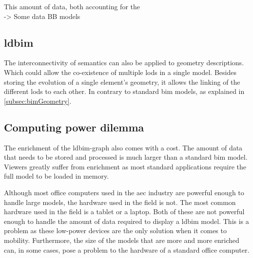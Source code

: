 This amount of data, both accounting for the \\
-> Some data BB models

\subsection{\acs{ldbim}}





The interconnectivity of semantics can also be applied to geometry descriptions. Which could allow the co-existence of multiple \ac{lod}s in a single model. Besides storing the evolution of a single element's geometry, it allows the linking of the different \ac{lod}s to each other. In contrary to standard \ac{bim} models, as explained in \ref{subsec:bimGeometry}.

\subsection{Computing power dilemma} \label{subsec:computingPower}
The enrichment of the \ac{ldbim}-graph also comes with a cost. The amount of data that needs to be stored and processed is much larger than a standard \ac{bim} model. Viewers greatly suffer from enrichment as most standard applications require the full model to be loaded in memory.

Although most office computers used in the \ac{aec} industry are powerful enough to handle large models, the hardware used in the field is not. The most common hardware used in the field is a tablet or a laptop. Both of these are not powerful enough to handle the amount of data required to display a \ac{ldbim} model. This is a problem as these low-power devices are the only solution when it comes to mobility. Furthermore, the size of the models that are more and more enriched can, in some cases, pose a problem to the hardware of a standard office computer.


